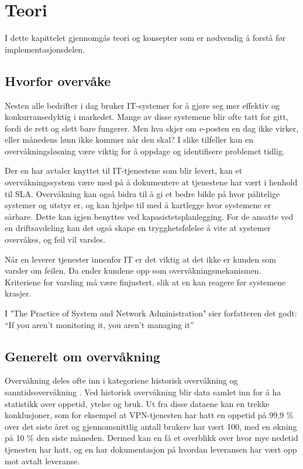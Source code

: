 \chapter{Teori}
I dette kapittelet gjennomgås teori og konsepter som er nødvendig å forstå før implementasjonsdelen.
\section{Hvorfor overvåke}
Nesten alle bedrifter i dag bruker IT-systemer for å gjøre seg mer effektiv og konkurransedyktig i markedet. Mange av disse systemene blir ofte tatt for gitt, fordi de rett og slett bare fungerer. Men hva skjer om e-posten en dag ikke virker, eller månedens lønn ikke kommer når den skal? I slike tilfeller kan en overvåkningsløsning være viktig for å oppdage og identifisere problemet tidlig.

Der en har avtaler knyttet til IT-tjenestene som blir levert, kan et overvåkningssystem være med på å dokumentere at tjenestene har vært i henhold til SLA. Overvåkning kan også bidra til å gi et bedre bilde på hvor pålitelige systemer og utstyr er, og kan hjelpe til med å kartlegge hvor systemene er sårbare. Dette kan igjen benyttes ved kapasistetsplanlegging. For de ansatte ved en driftsavdeling kan det også skape en trygghetsfølelse å vite at systemer overvåkes, og feil vil varsles.

Når en leverer tjenester innenfor IT er det viktig at det ikke er kunden som varsler om feilen. Da ender kundene opp som overvåkningsmekanismen. Kriteriene for varsling må være finjustert, slik at en kan reagere før systemene krasjer.

I "The Practice of System and Network Administration" sier forfatteren det godt: 
``If you aren’t monitoring it, you aren’t managing it''

\section{Generelt om overvåkning}\label{sec:omovervakning}
Overvåkning deles ofte inn i kategoriene historisk overvåkning og sanntidsovervåkning \cite{practiceofsystemandnetwork}. 
Ved historisk overvåkning blir data samlet inn for å ha statistikk over oppetid, ytelse og bruk. Ut fra disse dataene kan en trekke konklusjoner, som for eksempel at VPN-tjenesten har hatt en oppetid på 99,9 \% over det siste året og gjennomsnittlig antall brukere har vært 100, med en økning på 10 \% den siste måneden. Dermed kan en få et overblikk over hvor mye nedetid tjenesten har hatt, og en har dokumentasjon på hvordan leveransen har vært opp mot avtalt leveranse.


